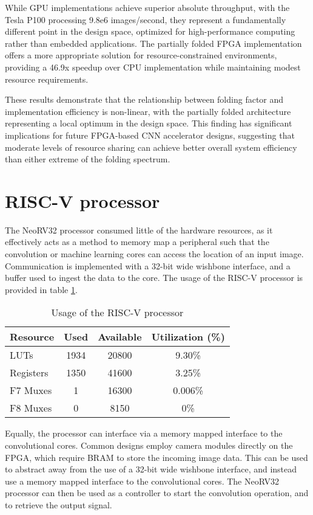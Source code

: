While GPU implementations achieve superior absolute throughput, with the Tesla P100 processing 9.8e6 images/second, they represent a fundamentally different point in the design space, optimized for high-performance computing rather than embedded applications. The partially folded FPGA implementation offers a more appropriate solution for resource-constrained environments, providing a 46.9x speedup over CPU implementation while maintaining modest resource requirements.

These results demonstrate that the relationship between folding factor and implementation efficiency is non-linear, with the partially folded architecture representing a local optimum in the design space. This finding has significant implications for future FPGA-based CNN accelerator designs, suggesting that moderate levels of resource sharing can achieve better overall system efficiency than either extreme of the folding spectrum.

\section{RISC-V processor}
The NeoRV32 processor consumed little of the hardware resources, as it effectively acts as a method to memory map a peripheral such that the convolution or machine learning cores can access the location of an input image.
Communication is implemented with a 32-bit wide wishbone interface, and a buffer used to ingest the data to the core.
The usage of the RISC-V processor is provided in table \ref{tab:riscv_usage}.

\begin{table}[h!]
    \centering
    \caption{Usage of the RISC-V processor}
    \label{tab:riscv_usage}
    \begin{tabular}{lccc}
        \toprule
        Resource & Used & Available & Utilization (\%) \\
        \midrule
        LUTs & 1934 & 20800 & 9.30\% \\
        Registers & 1350 & 41600 & 3.25\% \\
        F7 Muxes & 1 & 16300 & 0.006\% \\
        F8 Muxes & 0 & 8150 & 0\% \\
        \bottomrule
    \end{tabular}
\end{table}

Equally, the processor can interface via a memory mapped interface to the convolutional cores.
Common designs employ camera modules directly on the FPGA, which require BRAM to store the incoming image data.
This can be used to abstract away from the use of a 32-bit wide wishbone interface, and instead use a memory mapped interface to the convolutional cores.
The NeoRV32 processor can then be used as a controller to start the convolution operation, and to retrieve the output signal. 

